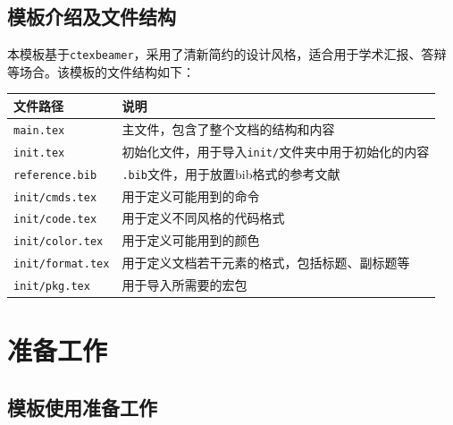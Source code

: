 \documentclass[8pt]{ctexbeamer}
\begin{document}
\makesection

\subsection{模板介绍及文件结构}

\begin{frame}{\insertsection}{\insertsubsection}

    本模板基于\lstinline|ctexbeamer|，采用了清新简约的设计风格，适合用于学术汇报、答辩等场合。该模板的文件结构如下：

    \begin{table}
        \renewcommand{\arraystretch}{1.5}
        \begin{tabular}{ll}
            \toprule
            文件路径 & 说明 \\
            \midrule
            \lstinline|main.tex| & 主文件，包含了整个文档的结构和内容 \\
            \lstinline|init.tex| & 初始化文件，用于导入\lstinline|init/|文件夹中用于初始化的内容 \\
            \lstinline|reference.bib| & \lstinline|.bib|文件，用于放置bib格式的参考文献 \\
            \lstinline|init/cmds.tex| & 用于定义可能用到的命令 \\
            \lstinline|init/code.tex| & 用于定义不同风格的代码格式 \\
            \lstinline|init/color.tex| & 用于定义可能用到的颜色 \\
            \lstinline|init/format.tex| & 用于定义文档若干元素的格式，包括标题、副标题等 \\
            \lstinline|init/pkg.tex| & 用于导入所需要的宏包 \\
            \bottomrule
        \end{tabular}
    \end{table}

\end{frame}

\section{准备工作}

\makesection

\subsection{模板使用准备工作}
\end{document}
